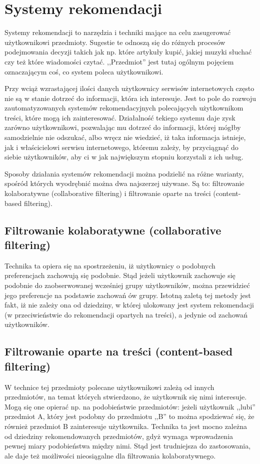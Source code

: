 \documentclass[pl]{minipw} %
\begin{document}
\section{Systemy rekomendacji}

Systemy rekomendacji to narzędzia i techniki mające na celu zasugerować użytkownikowi przedmioty. Sugestie te odnoszą się do różnych procesów podejmowania decyzji takich jak np. które artykuły kupić, jakiej muzyki słuchać czy też które wiadomości czytać. ,,Przedmiot'' jest tutaj ogólnym pojęciem oznaczającym coś, co system poleca użytkownikowi. \cite{handbook} 

Przy wciąż wzrastającej ilości danych użytkownicy serwisów internetowych często nie są w stanie dotrzeć do informacji, która ich interesuje. Jest to pole do rozwoju zautomatyzowanych systemów rekomendacyjnych polecających użytkownikom treści, które mogą ich zainteresować. Działalność tekiego systemu daje zysk zarówno użytkownikowi, pozwalając mu dotrzeć do informacji, której mógłby samodzielnie nie odszukać, albo wręcz nie wiedzieć, iż taka informacja istnieje, jak i właścicielowi serwisu internetowego, któremu zależy, by przyciągnąć do siebie użytkowników, aby ci w jak największym stopniu korzystali z ich usług.

Sposoby działania systemów rekomendacji można podzielić na różne warianty, spośród których wyodrębnić można dwa najszerzej używane. Są to: filtrowanie kolaboratywne (collaborative filtering) i filtrowanie oparte na treści (content-based filtering).

\subsection{Filtrowanie kolaboratywne (collaborative filtering)}
Technika ta opiera się na spostrzeżeniu, iż użytkownicy o podobnych preferencjach zachowują się podobnie. Stąd jeżeli użytkownik zachowuje się podobnie do zaobserwowanej wcześniej grupy użytkowników, można przewidzieć jego preferencje na podstawie zachowań ów grupy. Istotną zaletą tej metody jest fakt, iż nie zależy ona od dziedziny, w której ulokowany jest system rekomendacji (w przeciwieństwie do rekomendacji opartych na treści), a jedynie od zachowań użytkowników.
\subsection{Filtrowanie oparte na treści (content-based filtering)}
W technice tej przedmioty polecane użytkownikowi zależą od innych przedmiotów, na temat których stwierdzono, że użytkownik się nimi interesuje. Mogą się one opierać np. na podobieństwie przedmiotów: jeżeli użytkownik ,,lubi'' przedmiot A, który jest podobny do przedmiotu ,,B'' to można spodziewać się, że również przedmiot B zainteresuje użytkownika. Technika ta jest mocno zależna od dziedziny rekomendowanych przedmiotów, gdyż wymaga wprowadzenia pewnej miary podobieństwa między nimi. Stąd jest trudniejsza do zastosowania, ale daje też możliwości nieosiągalne dla filtrowania kolaboratywnego.
\end{document}
